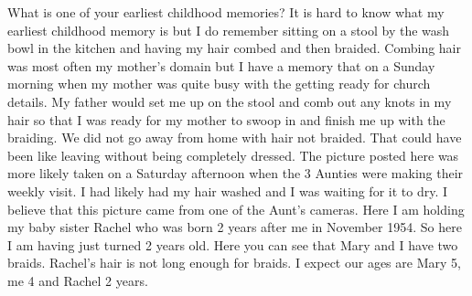 What is one of your earliest childhood memories?
It is hard to know what my earliest childhood memory is but I do remember sitting on a stool by the wash bowl in the kitchen and having my hair combed and then braided. Combing hair was most often my mother's domain but I have a memory that on a Sunday morning when my mother was quite busy with the getting ready for church details. My father would set me up on the stool and comb out any knots in my hair so that I was ready for my mother to swoop in and finish me up with the braiding. We did not go away from home with hair not braided. That could have been like leaving without being completely dressed.
The picture posted here was more likely taken on a Saturday afternoon when the 3 Aunties were making their weekly visit. I had likely had my hair washed and I was waiting for it to dry. I believe that this picture came from one of the Aunt's cameras.
Here I am holding my baby sister Rachel who was born 2 years after me in November 1954. So here I am having just turned 2 years old.
Here you can see that Mary and I have two braids. Rachel's hair is not long enough for braids. I expect our ages are Mary 5, me 4 and Rachel 2 years.





